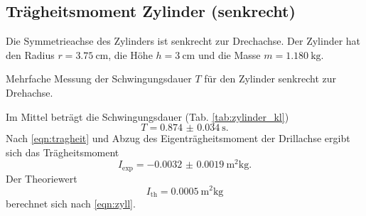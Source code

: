 \subsection{Trägheitsmoment Zylinder (senkrecht)}
Die Symmetrieachse des Zylinders ist senkrecht zur Drechachse.
Der Zylinder hat den Radius $r = \SI{3.75}{\centi\metre}$, die Höhe $h = \SI{3}{\centi\metre}$ und die Masse $m = \SI{1.180}{\kg}$.
\begin{table}
    \centering
    \caption{Mehrfache Messung der Schwingungsdauer $T$ für den Zylinder senkrecht zur Drehachse.}
    \label{tab:zylinder_kl}  
\end{table}
\FloatBarrier
Im Mittel beträgt die Schwingungsdauer (Tab. \ref{tab:zylinder_kl})
\begin{equation*}
    T = \SI{0.874(34)}{\second} .
\end{equation*}
Nach \autoref{eqn:tragheit} und Abzug des Eigenträgheitsmoment der Drillachse ergibt sich das Trägheitsmoment
\begin{equation}
    I_\text{exp} = \SI{-0.0032(19)}{\metre^2\kg} .
\end{equation}
Der Theoriewert
\begin{equation}
    I_\text{th} = \SI{0.0005}{\metre^2\kg}
\end{equation}
berechnet sich nach \autoref{eqn:zyll}.

